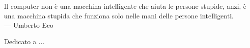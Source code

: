 
\cleardoublepage
{}
\thispagestyle{empty}

\vspace*{3cm}

\begin{center}
Il computer non è una macchina intelligente che aiuta le persone stupide, anzi, è una macchina stupida che funziona solo nelle mani delle persone intelligenti. \\ \medskip
--- Umberto Eco    
\end{center}

\medskip

\begin{center}
Dedicato a ...
\end{center}
